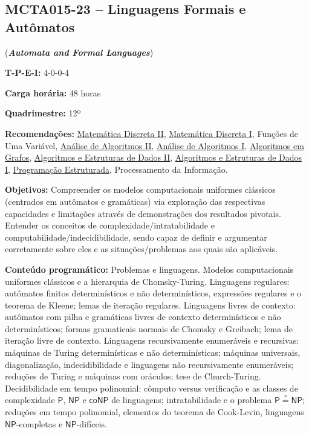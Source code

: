 \documentclass[class=article, crop=false]{standalone}
\begin{document}
\subsection{MCTA015-23 -- Linguagens Formais e Autômatos}
\label{disc:lfa}

(\textbf{\textit{Automata and Formal Languages}})

\begin{center}
    \begin{minipage}{0.85\textwidth}
        \textbf{T-P-E-I:} 4-0-0-4
        
        \textbf{Carga horária:} 48 horas
        
        \textbf{Quadrimestre:} 12º 
        
        \textbf{Recomendações:} 
        \hyperref[disc:mdII]{Matemática Discreta II},
        \hyperref[disc:mdI]{Matemática Discreta I},
        Funções de Uma Variável,
        \hyperref[disc:aaII]{Análise de Algoritmos II},
        \hyperref[disc:aaI]{Análise de Algoritmos I},
        \hyperref[disc:ag]{Algoritmos em Grafos},
        \hyperref[disc:aedII]{Algoritmos e Estruturas de Dados II},
        \hyperref[disc:aedI]{Algoritmos e Estruturas de Dados I},
        \hyperref[disc:pe]{Programação Estruturada},
        Processamento da Informação.
    \end{minipage}
\end{center}

\textbf{Objetivos:}
Compreender os modelos computacionais uniformes clássicos (centrados em
autômatos e gramáticas) via exploração das respectivas capacidades e limitações
através de demonstrações dos resultados pivotais. 
Entender os conceitos de complexidade/intratabilidade e
computabilidade/indecidibilidade, sendo capaz de definir e argumentar
corretamente sobre eles e as situações/problemas aos quais são aplicáveis.

\textbf{Conteúdo programático:}
Problemas e linguagens.
Modelos computacionais uniformes clássicos e a hierarquia de Chomsky-Turing. 
Linguagens regulares: autômatos finitos determinísticos e não determinísticos,
expressões regulares e o teorema de Kleene; lemas de iteração regulares. 
Linguagens livres de contexto: autômatos com pilha e gramáticas livres de
contexto determinísticos e não determinísticos; formas gramaticais normais de
Chomsky e Greibach; lema de iteração livre de contexto. 
Linguagens recursivamente enumeráveis e recursivas: máquinas de Turing
determinísticas e não determinísticas; máquinas universais, diagonalização,
indecidibilidade e linguagens não recursivamente enumeráveis; reduções de
Turing e máquinas com oráculos; tese de Church-Turing.
Decidibilidade em tempo polinomial: cômputo versus verificação e as classes de
complexidade $\mathsf{P}$, $\mathsf{NP}$ e $\mathsf{coNP}$ de linguagens;
intratabilidade e o problema $\mathsf{P}\stackrel{?}{=}\mathsf{NP}$; reduções
em tempo polinomial, elementos do teorema de Cook-Levin, linguagens
$\mathsf{NP}$-completas e $\mathsf{NP}$-difíceis.
\end{document}

